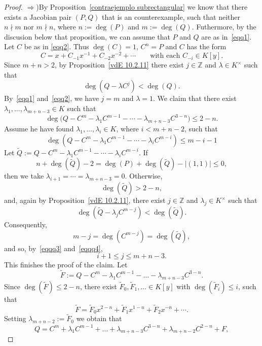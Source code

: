 \documentclass[reqno,a4paper]{amsart}
\theoremstyle{definition}
\theoremstyle{remark}
\begin{document}
\begin{proof} $\Rightarrow$)\enspace By Proposition~\ref{contraejemplo subrectangular}
we know that there exists a Jacobian pair $(P,Q)$ that is an counterexample, such that
neither $n\nmid m$ nor $m\nmid n$, where $n:=\deg(P)$ and $m:=\deg(Q)$. Futhermore,
by the discusion below that proposition, we can assume that $P$ and $Q$ are as
in~\eqref{eqq1}. Let $C$ be as in \eqref{eqq2}. Thus $\deg(C) = 1$, $C^n = P$ and $C$
has the form
$$
C = x + C_{-1}x^{-1}+ C_{-2}x^{-2} + \cdots \qquad\text{with each $C_{-i}\in K[y]$.}
$$
Since $m+n>2$, by Proposition~\ref{vdE 10.2.11} there exist $j\in\mathds{Z}$ and
$\lambda\in K^{\times}$ such that
$$
\deg(Q-\lambda C^j)<\deg(Q).
$$
By~\eqref{eqq1} and~\eqref{eqq2}, we have $j=m$ and $\lambda = 1$. We claim that there exist
 $\lambda_1,\dots,\lambda_{m+n-3}\in K$ such that
\begin{equation}
\deg\bigl(Q - C^m - \lambda_1 C^{m-1}-\cdots-\lambda_{m+n-3} C^{3-n}\bigr)\le 2-n.\label{eqqq5}
\end{equation}
Assume he have found $\lambda_1,\dots,\lambda_i\in K$, where $i<m+n-2$, such that
\begin{equation}
\deg(Q-C^m-\lambda_1C^{m-1}-\cdots-\lambda_i C^{m-i})\le m-i-1\label{eqqq3}
\end{equation}
Let $\tilde Q:= Q-C^m-\lambda_1C^{m-1}-\cdots-\lambda_i C^{m-i}$. If
$$
n+\deg(\tilde Q)-2 = \deg(P)+\deg(\tilde Q)-|(1,1)| \le 0,
$$
then we take $\lambda_{i+1} = \cdots = \lambda_{m+n-3} = 0$. Otherwise,
\begin{equation}
\deg(\tilde Q) > 2 - n,\label{eqqq4}
\end{equation}
and, again by Proposition~\ref{vdE 10.2.11}, there exist $j\in \mathds{Z}$ and $\lambda_j\in K^{\times}$
such that
$$
\deg(\tilde Q - \lambda_j C^{m-j})<\deg(\tilde Q).
$$
Consequently,
$$
m-j = \deg(C^{m-j}) = \deg(\tilde Q),
$$
and so, by~\eqref{eqqq3} and~\eqref{eqqq4},
$$
i+1\le j\le m+n-3.
$$
This finishes the proof of the claim. Let
$$
\tilde{F}:=Q - C^m - \lambda_1 C^{m-1}-\dots-\lambda_{m+n-3} C^{3-n}.
$$
Since $\deg(\tilde{F})\le 2-n$, there exist $\tilde{F}_0,\tilde{F}_1,\dots \in K[y]$ with
$\deg(\tilde{F}_i)\le i$, such that
$$
\tilde{F} = \tilde{F}_0 x^{2-n} + \tilde{F}_1 x^{1-n}+ \tilde{F}_2 x^{-n}+\cdots.
$$
Setting $\lambda_{m+n-2}:=\tilde{F}_0$ we obtain that
\begin{equation} \label{q como serie de C}
Q= C^m + \lambda_1 C^{m-1}+\dots+\lambda_{m+n-3} C^{3-n}+\lambda_{m+n-2} C^{2-n}+F,
\end{equation}

\end{proof}
\end{document}
